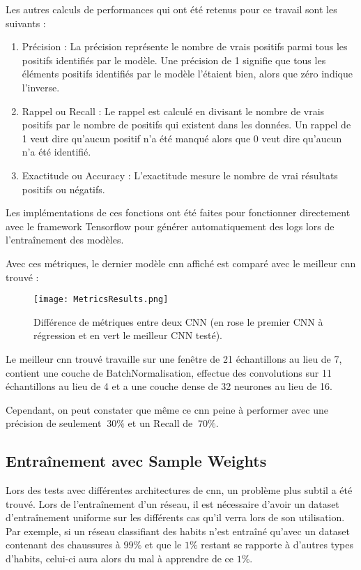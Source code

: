 Les autres calculs de performances qui ont été retenus pour ce travail sont les suivants :
\begin{enumerate}
    \item Précision : La précision représente le nombre de vrais positifs parmi tous les positifs identifiés par le modèle.
    	Une précision de 1 signifie que tous les éléments positifs identifiés par le modèle l'étaient bien, alors que zéro indique l'inverse.
    \item Rappel ou Recall : Le rappel est calculé en divisant le nombre de vrais positifs par le nombre de positifs qui existent dans les données.
		Un rappel de 1 veut dire qu'aucun positif n'a été manqué alors que 0 veut dire qu'aucun n'a été identifié.
    \item Exactitude ou Accuracy : L'exactitude mesure le nombre de vrai résultats positifs ou négatifs.
\end{enumerate}

Les implémentations de ces fonctions ont été faites pour fonctionner directement avec 
le framework Tensorflow pour générer automatiquement des logs lors de l'entraînement des modèles.

Avec ces métriques, le dernier modèle \gls{cnn} affiché est comparé avec le meilleur \gls{cnn} trouvé :
\newpage
\begin{figure}[tbph!]
	\centering
	\texttt{[image: MetricsResults.png]}
	\caption[Différence de métriques entre deux CNN]{Différence de métriques entre deux CNN (en rose le premier CNN à régression et en vert le meilleur CNN testé).}
\end{figure}

Le meilleur \gls{cnn} trouvé travaille sur une fenêtre de 21 échantillons au lieu de 7, contient une couche de BatchNormalisation,
effectue des convolutions sur 11 échantillons au lieu de 4 et a une couche dense de 32 neurones au lieu de 16.

Cependant, on peut constater que même ce \gls{cnn} peine à performer avec une précision de seulement $~30\%$ et un Recall de $~70\%$.


\subsection{Entraînement avec Sample Weights}
Lors des tests avec différentes architectures de \gls{cnn}, un problème plus subtil a été trouvé.
Lors de l'entraînement d'un réseau, il est nécessaire d'avoir un dataset d'entraînement uniforme sur les différents cas qu'il verra lors de son utilisation.
Par exemple, si un réseau classifiant des habits n'est entraîné qu'avec un dataset contenant des chaussures à $99\%$ et que le $1\%$ 
restant se rapporte à d'autres types d'habits, celui-ci aura alors du mal à apprendre de ce $1\%$.

